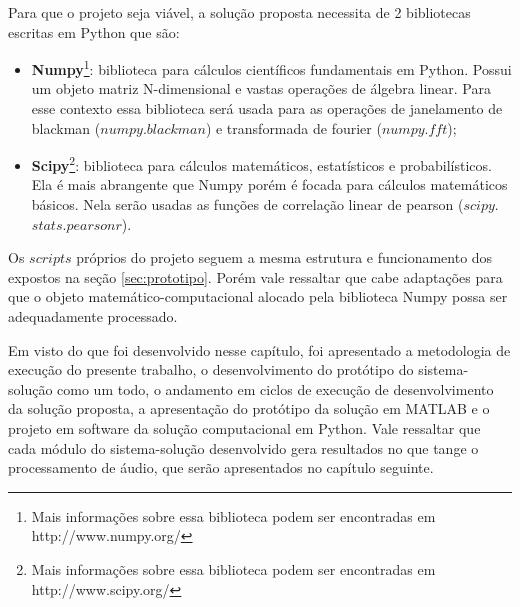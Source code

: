 Para que o projeto seja viável, a solução proposta necessita de 2 bibliotecas escritas em Python que são:
\begin{itemize}
	\item \textbf{Numpy}\footnote{Mais informações sobre essa biblioteca podem ser encontradas em http://www.numpy.org/}: biblioteca para cálculos científicos fundamentais em Python.  Possui um objeto matriz N-dimensional e vastas operações de álgebra linear. Para esse contexto essa biblioteca será usada para as operações de janelamento de blackman ($numpy$.$blackman$) e transformada de fourier ($numpy$.$fft$);
	\item \textbf{Scipy}\footnote{Mais informações sobre essa biblioteca podem ser encontradas em http://www.scipy.org/}: biblioteca para cálculos matemáticos, estatísticos e probabilísticos. Ela é mais abrangente que Numpy porém é focada para cálculos matemáticos básicos. Nela serão usadas as funções de correlação linear de pearson ($scipy$.$stats$.$pearsonr$).
\end{itemize}

Os $scripts$ próprios do projeto seguem a mesma estrutura e funcionamento dos expostos na seção \ref{sec:prototipo}. Porém vale ressaltar que cabe adaptações para que o objeto matemático-computacional alocado pela biblioteca Numpy possa ser adequadamente processado.

Em visto do que foi desenvolvido nesse capítulo, foi apresentado a metodologia de execução do presente trabalho, o desenvolvimento do protótipo do sistema-solução como um todo, o andamento em ciclos de execução de desenvolvimento da solução proposta, a apresentação do protótipo da solução em MATLAB e o projeto em software da solução computacional em Python. Vale ressaltar que cada módulo do sistema-solução desenvolvido gera resultados no que tange o processamento de áudio, que serão apresentados no capítulo seguinte.